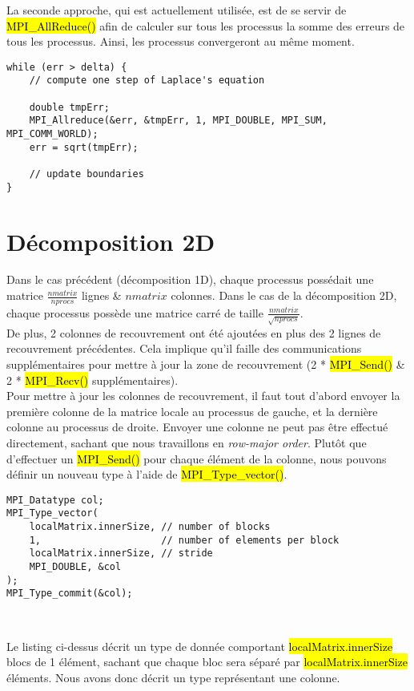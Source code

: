 \documentclass[a4paper,table]{article}
\begin{document}
La seconde approche, qui est actuellement utilisée, est de se servir de
\hl{MPI\_AllReduce()} afin de calculer sur tous les processus la somme des
erreurs de tous les processus. Ainsi, les processus convergeront au même
moment.

\begin{lstlisting}
while (err > delta) {
	// compute one step of Laplace's equation
	
    double tmpErr;
    MPI_Allreduce(&err, &tmpErr, 1, MPI_DOUBLE, MPI_SUM, MPI_COMM_WORLD);
    err = sqrt(tmpErr);
	
	// update boundaries
}
\end{lstlisting}

\section{Décomposition 2D}

Dans le cas précédent (décomposition 1D), chaque processus possédait une matrice
$\frac{nmatrix}{nprocs}$ lignes \& $nmatrix$ colonnes. Dans le cas de la
décomposition 2D, chaque processus possède une matrice carré de taille
$\frac{nmatrix}{\sqrt{nprocs}}$.\\

De plus, 2 colonnes de recouvrement ont été ajoutées en plus des 2 lignes de
recouvrement précédentes. Cela implique qu'il faille des communications
supplémentaires pour mettre à jour la zone de recouvrement (2 * \hl{MPI\_Send()}
\& 2 * \hl{MPI\_Recv()} supplémentaires).\\

Pour mettre à jour les colonnes de recouvrement, il faut tout d'abord envoyer
la première colonne de la matrice locale au processus de gauche, et la dernière
colonne au processus de droite. Envoyer une colonne ne peut pas être effectué
directement, sachant que nous travaillons en \emph{row-major order}. Plutôt que
d'effectuer un \hl{MPI\_Send()} pour chaque élément de la colonne, nous pouvons
définir un nouveau type à l'aide de \hl{MPI\_Type\_vector()}.\\

\begin{lstlisting}
MPI_Datatype col;
MPI_Type_vector(
    localMatrix.innerSize, // number of blocks
    1,                     // number of elements per block
    localMatrix.innerSize, // stride
    MPI_DOUBLE, &col
);
MPI_Type_commit(&col);
\end{lstlisting}
\

Le listing ci-dessus décrit un type de donnée comportant
\hl{localMatrix.innerSize} blocs de 1 élément, sachant que chaque bloc sera
séparé par \hl{localMatrix.innerSize} éléments. Nous avons donc décrit un
type représentant une colonne.\\
\end{document}
